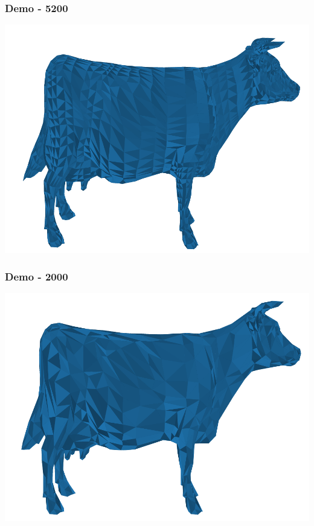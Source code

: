 \documentclass{beamer}
\begin{document}
\begin{frame}
\frametitle{Demo - 5200}
\includegraphics[width=\textwidth]{img/kravaVSE.pdf}
\end{frame}


\begin{frame}
\frametitle{Demo - 2000}
\includegraphics[width=\textwidth]{img/krava2000.pdf}
\end{frame}
\end{document}
